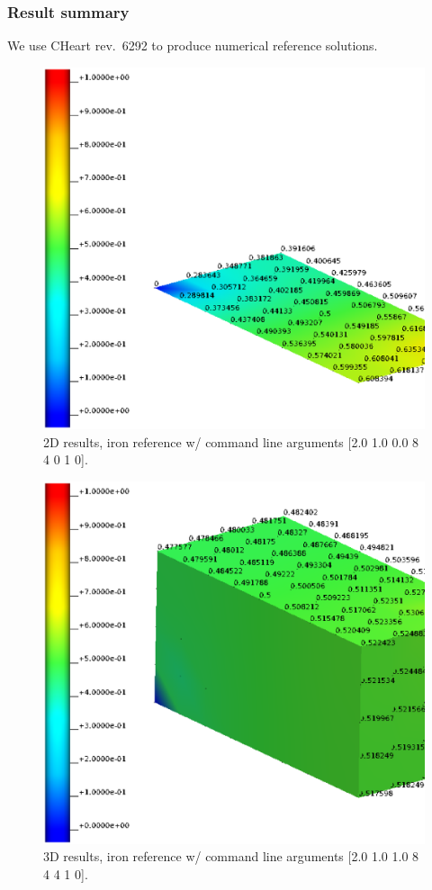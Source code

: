 \subsubsection{Result summary}
%
We use CHeart rev.\ 6292 to produce numerical reference solutions.
%


%
\begin{figure}[h!]
    \centering 
    \includegraphics[width=0.9\columnwidth]{examples/example-0001-u/doc/figures/iron_reference_2D.eps} 
    \caption{2D results, iron reference w/ command line arguments [2.0 1.0 0.0 8 4 0 1 0].}
    \label{example-0001-u-iron-2D-reference-fig}
\end{figure}
%
\begin{figure}[h!]
    \centering 
    \includegraphics[width=0.9\columnwidth]{examples/example-0001-u/doc/figures/iron_reference_3D.eps} 
    \caption{3D results, iron reference w/ command line arguments [2.0 1.0 1.0 8 4 4 1 0].}
    \label{example-0001-u-iron-3D-reference-fig}
\end{figure}
%
